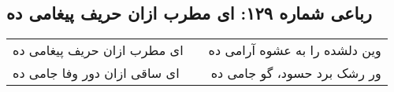 \begin{center}
\section*{رباعی شماره ۱۲۹: ای مطرب ازان حریف پیغامی ده}
\label{sec:129}
\begin{longtable}{l p{0.5cm} r}
ای مطرب ازان حریف پیغامی ده
&&
وین دلشده را به عشوه آرامی ده
\\
ای ساقی ازان دور وفا جامی ده
&&
ور رشک برد حسود، گو جامی ده
\\
\end{longtable}
\end{center}
